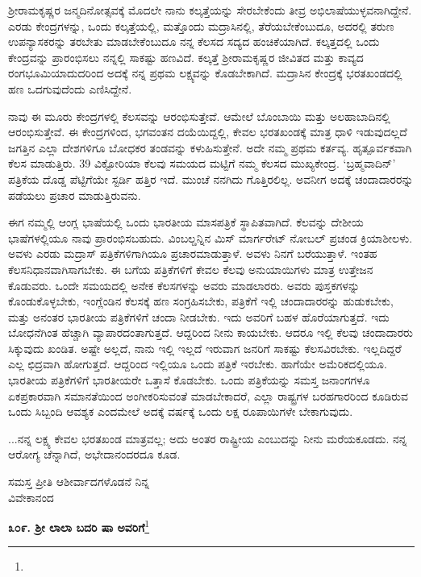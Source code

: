 ಶ‍್ರೀರಾಮಕೃಷ್ಣರ ಜನ್ಮದಿನೋತ್ಸವಕ್ಕೆ ಮೊದಲೇ ನಾನು ಕಲ್ಕತ್ತೆಯನ್ನು ಸೇರಬೇಕೆಂದು ತೀವ್ರ ಅಭಿಲಾಷೆಯುಳ್ಳವನಾಗಿದ್ದೇನೆ. ಎರಡು ಕೇಂದ್ರಗಳನ್ನು, ಒಂದು ಕಲ್ಕತ್ತೆಯಲ್ಲಿ, ಮತ್ತೊಂದು ಮದ್ರಾಸಿನಲ್ಲಿ, ತೆರೆಯಬೇಕೆಂಬುದೂ, ಅದರಲ್ಲಿ ತರುಣ ಉಪನ್ಯಾಸಕರನ್ನು ತರಬೇತು ಮಾಡಬೇಕೆಂಬುದೂ ನನ್ನ ಕೆಲಸದ ಸದ್ಯದ ಹಂಚಿಕೆಯಾಗಿದೆ. ಕಲ್ಕತ್ತದಲ್ಲಿ ಒಂದು ಕೇಂದ್ರವನ್ನು ಪ್ರಾರಂಭಿಸಲು ನನ್ನಲ್ಲಿ ಸಾಕಷ್ಟು ಹಣವಿದೆ. ಕಲ್ಕತ್ತೆ ಶ‍್ರೀರಾಮಕೃಷ್ಣರ ಜೀವಿತದ ಮತ್ತು ಕಾವ್ಯದ ರಂಗಭೂಮಿಯಾದುದರಿಂದ ಅದಕ್ಕೆ ನನ್ನ ಪ್ರಥಮ ಲಕ್ಷ್ಯವನ್ನು ಕೊಡಬೇಕಾಗಿದೆ. ಮದ್ರಾಸಿನ ಕೇಂದ್ರಕ್ಕೆ ಭರತಖಂಡದಲ್ಲಿ ಹಣ ಒದಗುವುದೆಂದು ಎಣಿಸಿದ್ದೇನೆ.

ನಾವು ಈ ಮೂರು ಕೇಂದ್ರಗಳಲ್ಲಿ ಕೆಲಸವನ್ನು ಆರಂಭಿಸುತ್ತೇವೆ. ಆಮೇಲೆ ಬೊಂಬಾಯಿ ಮತ್ತು ಅಲಹಾಬಾದಿನಲ್ಲಿ ಆರಂಭಿಸುತ್ತೇವೆ. ಈ ಕೇಂದ್ರಗಳಿಂದ, ಭಗವಂತನ ದಯೆಯಿದ್ದಲ್ಲಿ, ಕೇವಲ ಭರತಖಂಡಕ್ಕೆ ಮಾತ್ರ ಧಾಳಿ ಇಡುವುದಲ್ಲದೆ ಜಗತ್ತಿನ ಎಲ್ಲಾ ದೇಶಗಳಿಗೂ ಬೋಧಕರ ತಂಡವನ್ನು ಕಳುಹಿಸುತ್ತೇನೆ. ಅದೇ ನಮ್ಮ ಪ್ರಥಮ ಕರ್ತವ್ಯ. ಹೃತ್ಪೂರ್ವಕವಾಗಿ ಕೆಲಸ ಮಾಡುತ್ತಿರು. 39 ವಿಕ್ಟೋರಿಯಾ ಕೆಲವು ಸಮಯದ ಮಟ್ಟಿಗೆ ನಮ್ಮ ಕೆಲಸದ ಮುಖ್ಯಕೇಂದ್ರ. `ಬ್ರಹ್ಮವಾದಿನ್' ಪತ್ರಿಕೆಯ ದೊಡ್ಡ ಪೆಟ್ಟಿಗೆಯೇ ಸ್ಟರ್ಡಿ ಹತ್ತಿರ ಇದೆ. ಮುಂಚೆ ನನಗಿದು ಗೊತ್ತಿರಲಿಲ್ಲ. ಅವನೀಗ ಅದಕ್ಕೆ ಚಂದಾದಾರರನ್ನು ಪಡೆಯಲು ಪ್ರಚಾರ ಮಾಡುತ್ತಿರುವನು.

ಈಗ ನಮ್ಮಲ್ಲಿ ಆಂಗ್ಲ ಭಾಷೆಯಲ್ಲಿ ಒಂದು ಭಾರತೀಯ ಮಾಸಪತ್ರಿಕೆ ಸ್ಥಾಪಿತವಾಗಿದೆ. ಕೆಲವನ್ನು ದೇಶೀಯ ಭಾಷೆಗಳಲ್ಲಿಯೂ ನಾವು ಪ್ರಾರಂಭಿಸಬಹುದು. ವಿಂಬಲ್ಡನ್ನಿನ ಮಿಸ್ ಮಾರ್ಗರೇಟ್ ನೋಬಲ್ ಪ್ರಚಂಡ ಕ್ರಿಯಾಶೀಲಳು. ಅವಳು ಎರಡು ಮದ್ರಾಸ್ ಪತ್ರಿಕೆಗಳಿಗಾಗಿಯೂ ಪ್ರಚಾರಮಾಡುತ್ತಾಳೆ. ಅವಳು ನಿನಗೆ ಬರೆಯುತ್ತಾಳೆ. ಇಂತಹ ಕೆಲಸನಿಧಾನವಾಗಿಸಾಗಬೇಕು. ಈ ಬಗೆಯ ಪತ್ರಿಕೆಗಳಿಗೆ ಕೇವಲ ಕೆಲವು ಅನುಯಾಯಿಗಳು ಮಾತ್ರ ಉತ್ತೇಜನ ಕೊಡುವರು. ಒಂದೇ ಸಮಯದಲ್ಲಿ ಅನೇಕ ಕೆಲಸಗಳನ್ನು ಅವರು ಮಾಡಲಾರರು. ಅವರು ಪುಸ್ತಕಗಳನ್ನು ಕೊಂಡುಕೊಳ್ಳಬೇಕು, ಇಂಗ್ಲೆಂಡಿನ ಕೆಲಸಕ್ಕೆ ಹಣ ಸಂಗ್ರಹಿಸಬೇಕು, ಪತ್ರಿಕೆಗೆ ಇಲ್ಲಿ ಚಂದಾದಾರರನ್ನು ಹುಡುಕಬೇಕು, ಮತ್ತು ಅನಂತರ ಭಾರತೀಯ ಪತ್ರಿಕೆಗಳಿಗೆ ಚಂದಾ ನೀಡಬೇಕು. ಇದು ಅವರಿಗೆ ಬಹಳ ಹೊರೆಯಾಗುತ್ತದೆ. ಇದು ಬೋಧನೆಗಿಂತ ಹೆಚ್ಚಾಗಿ ವ್ಯಾಪಾರದಂತಾಗುತ್ತದೆ. ಆದ್ದರಿಂದ ನೀನು ಕಾಯಬೇಕು. ಆದರೂ ಇಲ್ಲಿ ಕೆಲವು ಚಂದಾದಾರರು ಸಿಕ್ಕುವುದು ಖಂಡಿತ. ಅಷ್ಟೇ ಅಲ್ಲದೆ, ನಾನು ಇಲ್ಲಿ ಇಲ್ಲದೆ ಇರುವಾಗ ಜನರಿಗೆ ಸಾಕಷ್ಟು ಕೆಲಸವಿರಬೇಕು. ಇಲ್ಲದಿದ್ದರೆ ಎಲ್ಲ ಛಿದ್ರವಾಗಿ ಹೋಗುತ್ತದೆ. ಆದ್ದರಿಂದ ಇಲ್ಲಿಯೂ ಒಂದು ಪತ್ರಿಕೆ ಇರಬೇಕು. ಹಾಗೆಯೇ ಅಮೆರಿಕದಲ್ಲಿಯೂ. ಭಾರತೀಯ ಪತ್ರಿಕೆಗಳಿಗೆ ಭಾರತೀಯರೇ ಒತ್ತಾಸೆ ಕೊಡಬೇಕು. ಒಂದು ಪತ್ರಿಕೆಯನ್ನು ಸಮಸ್ತ ಜನಾಂಗಗಳೂ ಏಕಪ್ರಕಾರವಾಗಿ ಸಮಾನತೆಯಿಂದ ಅಂಗೀಕರಿಸುವಂತೆ ಮಾಡಬೇಕಾದರೆ, ಎಲ್ಲಾ ರಾಷ್ಟ್ರಗಳ ಬರಹಗಾರರಿಂದ ಕೂಡಿರುವ ಒಂದು ಸಿಬ್ಬಂದಿ ಆವಶ್ಯಕ ಎಂದಮೇಲೆ ಅದಕ್ಕೆ ವರ್ಷಕ್ಕೆ ಒಂದು ಲಕ್ಷ ರೂಪಾಯಿಗಳೇ ಬೇಕಾಗುವುದು.

\newpage

...ನನ್ನ ಲಕ್ಷ್ಯ ಕೇವಲ ಭರತಖಂಡ ಮಾತ್ರವಲ್ಲ; ಅದು ಅಂತರ ರಾಷ್ಟ್ರೀಯ ಎಂಬುದನ್ನು ನೀನು ಮರೆಯಕೂಡದು. ನನ್ನ ಆರೋಗ್ಯ ಚೆನ್ನಾಗಿದೆ, ಅಭೇದಾನಂದರದೂ ಕೂಡ.

{\flushright
ಸಮಸ್ತ ಪ್ರೀತಿ ಆಶೀರ್ವಾದಗಳೊಡನೆ ನಿನ್ನ\\ವಿವೇಕಾನಂದ\par}

\begin{center}
\textbf{೩೦೯. ಶ‍್ರೀ ಲಾಲಾ ಬದರಿ ಷಾ ಅವರಿಗೆ}\footnote{}
\end{center}

